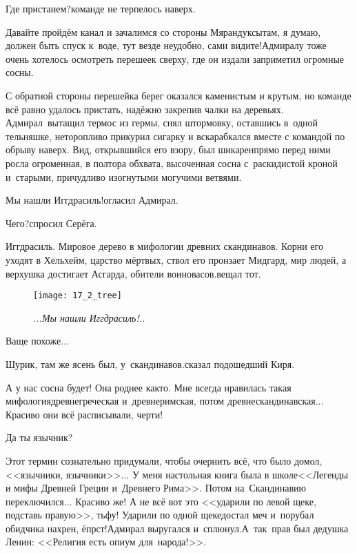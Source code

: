 \diagdash Где пристанем?\mdash команде не терпелось наверх.

\diagdash Давайте пройдём канал и зачалимся со стороны Мярандуксы\mdash там, я думаю, должен быть спуск к~воде, тут везде неудобно, сами видите!\mdash Адмиралу тоже очень хотелось осмотреть перешеек сверху, где он издали заприметил огромные сосны.

С обратной стороны перешейка берег оказался каменистым и крутым, но команде всё равно удалось пристать, надёжно закрепив чалки на деревьях. Адмирал~вытащил термос из гермы, снял штормовку, оставшись в~одной тельняшке, неторопливо прикурил сигарку и вскарабкался вместе с командой по обрыву наверх. Вид, открывшийся его взору, был шикарен\mdash прямо перед ними росла огроменная, в полтора обхвата, высоченная сосна с~раскидистой кроной и~старыми, причудливо изогнутыми могучими ветвями. %

\diagdash Мы нашли Иггдрасиль!\mdash огласил Адмирал.

\diagdash Чего?\mdash спросил Серёга.

\diagdash Иггдрасиль. Мировое дерево в мифологии древних скандинавов. Корни его уходят в Хельхейм, царство мёртвых, ствол его пронзает Мидгард, мир людей, а верхушка достигает Асгарда, обители воинов\sdash асов.\mdash вещал тот. 

\newpage

\begin{wrapfigure}[20]{r}{0.55\textwidth}
\centering
\texttt{[image: 17\_2\_tree]}
\caption{\small\textit{...Мы нашли Иггдрасиль!..}}
\end{wrapfigure}
\diagdash Ваще похоже$\ldots$

\diagdash Шурик, там же ясень был, у~скандинавов.\mdash сказал подошедший Киря.

\diagdash А у нас сосна будет! Она роднее как\sdash то. Мне всегда нравилась такая мифология\mdash древнегреческая и~древнеримская, потом древнескандинавская$\ldots$ Красиво они всё расписывали, черти!

\diagdash Да ты язычник?

\diagdash Этот термин сознательно придумали, чтобы очернить всё, что было до\mdash мол, <<язычники, язычники>>$\ldots$ У меня настольная книга была в школе\mdash <<Легенды и мифы Древней Греции и~Древнего Рима>>\cite{Кун}. Потом на~Скандинавию переключился$\ldots$ Красиво же! А не всё вот это <<ударили по левой щеке, подставь правую>>, тьфу! Ударили по одной щеке\mdash достал меч и~порубал обидчика нахрен, ёпрст!\mdash Адмирал выругался и~сплюнул.\mdash А~так~прав был дедушка Ленин: <<Религия есть  опиум для~народа!>>\cite{ЛенинОпиумДляНарода}. 

